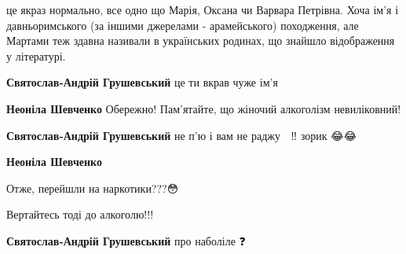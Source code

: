 \begin{itemize}
\begin{itemize}
це якраз нормально, все одно що Марія, Оксана чи Варвара Петрівна. Хоча ім'я і
давньоримського (за іншими джерелами - арамейського) походження, але Мартами
теж здавна називали в українських родинах, що знайшло відображення у
літературі.


 
\textbf{Святослав-Андрій Грушевський} це ти вкрав чуже ім'я

 
\textbf{Неоніла Шевченко} Обережно! Пам'ятайте, що жіночий алкоголізм невиліковний!

 
\textbf{Святослав-Андрій Грушевський} не п'ю і вам не раджу 🤣 ‼️ зорик 😂😂

 
\textbf{Неоніла Шевченко} 

Отже, перейшли на наркотики???😳

Вертайтесь тоді до алкоголю!!!

 
\textbf{Святослав-Андрій Грушевський} про наболіле ❓ 🤣 🤣

 

\end{itemize}
\end{itemize}
